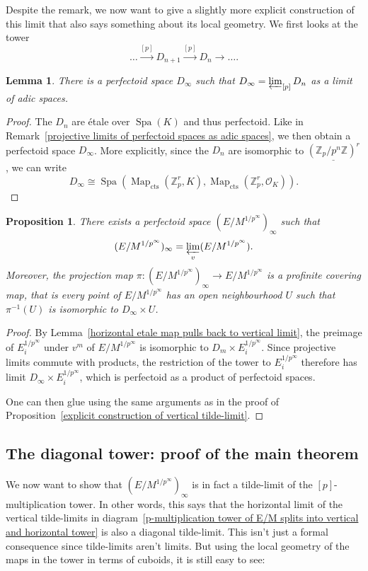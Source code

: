 \documentclass[10pt,oneside]{amsart}
\newtheorem{lemma}[theorem]{Lemma}
\newtheorem{proposition}[theorem]{Proposition}
\theoremstyle{definition}
\begin{document}
	Despite the remark, we now want to give a slightly more explicit construction of this limit that also says something about its local geometry. We first looks at the tower
	\[\dots \xrightarrow{[p]}D_{n+1}\xrightarrow{[p]}D_n\rightarrow\dots.\]
	\begin{lemma}
		There is a perfectoid space $D_\infty$ such that $D_\infty = \varprojlim_{[p]} D_n$ as a limit of adic spaces.
	\end{lemma}
	\begin{proof}
		The $D_n$ are \'etale over $\operatorname{Spa}(K)$ and thus perfectoid.
		Like in Remark~\ref{projective limits of perfectoid spaces as adic spaces}, we then obtain a perfectoid space $D_\infty$. More explicitly, since the $D_n$ are isomorphic to $\underline {(\mathbb Z_p/p^{n}\mathbb Z)^r}$, we can write \[D_\infty \cong\operatorname{Spa}(\operatorname{Map}_{\operatorname{cts}}(\mathbb Z_p^r,K),\operatorname{Map}_{\operatorname{cts}}(\mathbb Z_p^r,\mathcal O_K)).\]
	\end{proof}
	\begin{proposition}\label{horizontal limit of vertical limit}
	There exists a perfectoid space $(E/M^{1/p^\infty})_\infty$ such that \[(E/M^{1/p^\infty})_\infty= \varprojlim_{v}(E/M^{1/p^\infty}).\]
	 Moreover, the projection map $\pi:(E/M^{1/p^\infty})_\infty\rightarrow E/M^{1/p^\infty}$ is a profinite covering map, that is every point of $E/M^{1/p^\infty}$ has an open neighbourhood $U$ such that $\pi^{-1}(U)$ is isomorphic to $D_\infty \times U$.
	\end{proposition}
	\begin{proof}
	By Lemma~\ref{horizontal etale map pulls back to vertical limit}, the preimage of $E_i^{1/p^\infty}$ under $v^m$ of $E/M^{1/p^\infty}$ is isomorphic to $D_m\times E_i^{1/p^\infty}$. Since projective limits commute with products, the restriction of the tower to $E_i^{1/p^\infty}$ therefore has limit $D_\infty \times E_i^{1/p^\infty}$, which is perfectoid as a product of perfectoid spaces. 
	
	One can then glue using the same arguments as in the proof of Proposition~\ref{explicit construction of vertical tilde-limit}.
	\end{proof}
	
	\subsection{The diagonal tower: proof of the main theorem}
	We now want to show that $(E/M^{1/p^\infty})_\infty$ is in fact a tilde-limit of the $[p]$-multiplication tower. In other words, this says that the horizontal limit of the vertical tilde-limits in diagram~\ref{p-multiplication tower of E/M splits into vertical and horizontal tower} is also a diagonal tilde-limit.
	This isn't just a formal consequence since tilde-limits aren't limits. But using the local geometry of the maps in the tower in terms of cuboids, it is still easy to see:
	
\end{document}
